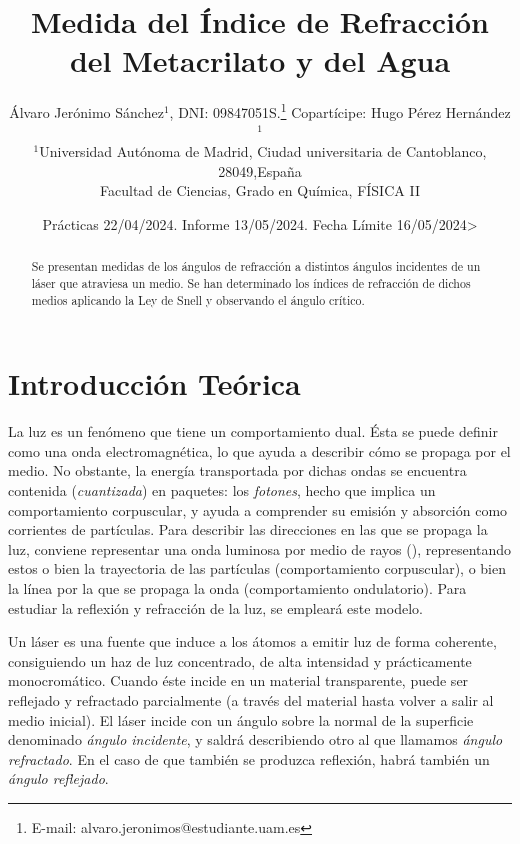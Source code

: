 \documentclass[fleqn,usenatbib,openbib]{mnras}
\title[Medida del Índice de Refracción]{Medida del Índice de Refracción del Metacrilato y del Agua}
\author[Álvaro Jerónimo Sánchez]{
Álvaro Jerónimo Sánchez$^{1}$, DNI: 09847051S.\thanks{E-mail: alvaro.jeronimos@estudiante.uam.es}
Copartícipe: Hugo Pérez Hernández$^{1}$
\\
$^{1}$Universidad Autónoma de Madrid, Ciudad universitaria de Cantoblanco, 28049,España \\
Facultad de Ciencias, Grado en Química, FÍSICA II
}
\date{Prácticas 22/04/2024. Informe 13/05/2024. Fecha Límite 16/05/2024>}
\begin{document}
\label{firstpage}
\pagerange{\pageref{firstpage}--\pageref{lastpage}}
\maketitle


\begin{abstract}

Se presentan medidas de los ángulos de refracción a distintos ángulos incidentes de un láser que atraviesa un medio. Se han determinado los índices de refracción de dichos medios aplicando la Ley de Snell y observando el ángulo crítico. 

\vspace{1cm}
\end{abstract}

\section{Introducción Teórica}

La luz es un fenómeno que tiene un comportamiento dual. Ésta se puede definir como una onda electromagnética, lo que ayuda a describir cómo se propaga por el medio. No obstante, la energía transportada por dichas ondas se encuentra contenida (\textit{cuantizada}) en paquetes: los \textit{fotones}, hecho que implica un comportamiento corpuscular, y ayuda a comprender su emisión y absorción como corrientes de partículas. Para describir las direcciones en las que se propaga la luz, conviene representar una onda luminosa por medio de rayos (\cite{Sears}), representando estos o bien la trayectoria de las partículas (comportamiento corpuscular), o bien la línea por la que se propaga la onda (comportamiento ondulatorio). Para estudiar la reflexión y refracción de la luz, se empleará este modelo. 

Un láser es una fuente que induce a los átomos a emitir luz de forma coherente, consiguiendo un haz de luz concentrado, de alta intensidad y prácticamente monocromático. Cuando éste incide en un material transparente, puede ser reflejado y refractado parcialmente (a través del material hasta volver a salir al medio inicial). El láser incide con un ángulo sobre la normal de la superficie denominado \textit{ángulo incidente}, y saldrá describiendo otro al que llamamos \textit{ángulo refractado}. En el caso de que también se produzca reflexión, habrá también un \textit{ángulo reflejado}. 
\end{document}
